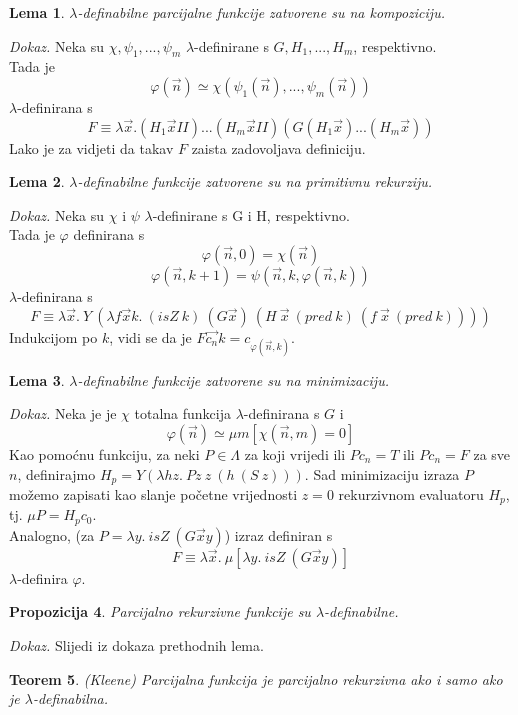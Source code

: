 \documentclass[a4paper,12pt]{article}
\newtheorem{thm}{Teorem}[subsection]
\newtheorem{lem}[thm]{Lema}
\newtheorem{prop}[thm]{Propozicija}
\newenvironment{proof}{\textit{Dokaz.}}{\hfill}
\begin{document}
\begin{lem} $\lambda$-definabilne parcijalne funkcije zatvorene su na kompoziciju.
\end{lem}
\begin{proof} Neka su $\chi, \psi_1 ,..., \psi_m$ $\lambda$-definirane s $G, H_1 ,..., H_m$, respektivno.\\ Tada je
    \[ \varphi (\overrightarrow{n}) \simeq \chi (\psi_1 (\overrightarrow{n}), ..., \psi_m (\overrightarrow{n})) \]
$\lambda$-definirana s
    \[ F \equiv \lambda \overrightarrow{x}.(H_1 \overrightarrow{x}II)  ... (H_m \overrightarrow{x}II) (G(H_1 \overrightarrow{x}) ... (H_m \overrightarrow{x})) \]
Lako je za vidjeti da takav $F$ zaista zadovoljava definiciju.
\end{proof}
\\
\begin{lem} $\lambda$-definabilne funkcije zatvorene su na primitivnu rekurziju.
\end{lem}
\begin{proof} Neka su $\chi$ i $\psi$ $\lambda$-definirane s G i H, respektivno.\\
Tada je $\varphi$ definirana s
    \[ \varphi (\overrightarrow{n}, 0) = \chi ( \overrightarrow{n}) \]
	\[ \varphi (\overrightarrow{n}, k+1) = \psi (\overrightarrow{n},k,\varphi (\overrightarrow{n},k)) \]
$\lambda$-definirana s
	\[ F \equiv \lambda \overrightarrow{x}.\ Y\ (\lambda f \overrightarrow{x} k.\ (isZ\ k)\ (G \overrightarrow{x})\ (H\ \overrightarrow{x}\ (pred\ k)\ (f\ \overrightarrow{x}\ (pred\ k)))) \]
Indukcijom po $k$, vidi se da je $F \overrightarrow{c_n} k = c_{\varphi (\overrightarrow{n},k)}$.
\end{proof}
\\
\begin{lem} $\lambda$-definabilne funkcije zatvorene su na minimizaciju.
\end{lem}
\begin{proof} Neka je je $\chi$ totalna funkcija $\lambda$-definirana s $G$ i 
	\[ \varphi(\overrightarrow{n}) \simeq \mu m [\chi(\overrightarrow{n},m) = 0] \]
Kao pomoćnu funkciju, za neki $P \in \Lambda$ za koji vrijedi ili $P c_n = T$ ili $P c_n = F$ za sve $n$, definirajmo $H_p = Y (\lambda h z.\ Pz\ z\ (h\ (S\ z)))$. Sad minimizaciju izraza $P$ možemo zapisati kao slanje početne vrijednosti $z=0$ rekurzivnom evaluatoru $H_p$, tj. $\mu P = H_p c_0$.\\
Analogno, (za $P = \lambda y.\ isZ\ (G \overrightarrow{x} y)$) izraz definiran s
	\[ F \equiv \lambda \overrightarrow{x}.\ \mu[\lambda y.\ isZ\ (G \overrightarrow{x} y)] \]
$\lambda$-definira $\varphi$.
\end{proof}
\\
\begin{prop} Parcijalno rekurzivne funkcije su $\lambda$-definabilne.
\end{prop}
\begin{proof}
Slijedi iz dokaza prethodnih lema.
\end{proof}
\\
\begin{thm} (Kleene) Parcijalna funkcija je parcijalno rekurzivna ako i samo ako je $\lambda$-definabilna.
\end{thm}
\end{document}
